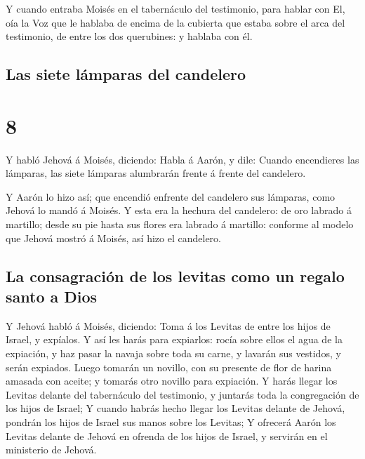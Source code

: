  Y cuando entraba Moisés en el tabernáculo del
testimonio, para hablar con El, oía la Voz que le hablaba de encima de
la cubierta que estaba sobre el arca del testimonio, de entre los dos
querubines: y hablaba con él.

\hypertarget{las-siete-luxe1mparas-del-candelero}{%
\subsection{Las siete lámparas del
candelero}\label{las-siete-luxe1mparas-del-candelero}}

\hypertarget{section-04-8}{%
\section{8}\label{section-04-8}}

 Y habló Jehová á Moisés, diciendo:  Habla á
Aarón, y dile: Cuando encendieres las lámparas, las siete lámparas
alumbrarán frente á frente del candelero.

 Y Aarón lo hizo así; que encendió enfrente del candelero
sus lámparas, como Jehová lo mandó á Moisés.  Y esta era
la hechura del candelero: de oro labrado á martillo; desde su pie hasta
sus flores era labrado á martillo: conforme al modelo que Jehová mostró
á Moisés, así hizo el candelero.

\hypertarget{la-consagraciuxf3n-de-los-levitas-como-un-regalo-santo-a-dios}{%
\subsection{La consagración de los levitas como un regalo santo a
Dios}\label{la-consagraciuxf3n-de-los-levitas-como-un-regalo-santo-a-dios}}

 Y Jehová habló á Moisés, diciendo:  Toma á
los Levitas de entre los hijos de Israel, y expíalos.  Y
así les harás para expiarlos: rocía sobre ellos el agua de la expiación,
y haz pasar la navaja sobre toda su carne, y lavarán sus vestidos, y
serán expiados.  Luego tomarán un novillo, con su presente
de flor de harina amasada con aceite; y tomarás otro novillo para
expiación.  Y harás llegar los Levitas delante del
tabernáculo del testimonio, y juntarás toda la congregación de los hijos
de Israel;  Y cuando habrás hecho llegar los Levitas
delante de Jehová, pondrán los hijos de Israel sus manos sobre los
Levitas;  Y ofrecerá Aarón los Levitas delante de Jehová
en ofrenda de los hijos de Israel, y servirán en el ministerio de
Jehová.

